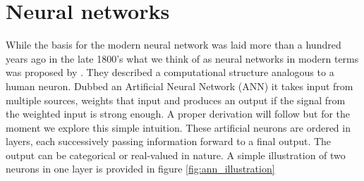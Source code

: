 
\section{Neural networks}\label{sec:ANN}

While the basis for the modern neural network was laid more than a hundred years ago in the late 1800's what we think of as neural networks in modern terms was proposed by \citet{McCulloch1943}. They described a computational structure analogous to a human neuron. Dubbed an Artificial Neural Network (ANN) it takes input from multiple sources, weights that input and produces an output if the signal from the weighted input is strong enough. A proper derivation will follow but for the moment we explore this simple intuition. These artificial neurons are ordered in layers, each successively passing information forward to a final output. The output can be categorical or real-valued in nature. A simple illustration of two neurons in one layer is provided in figure \ref{fig:ann_illustration}




